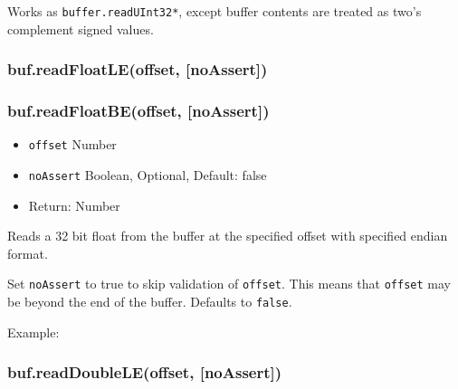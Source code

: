 Works as \texttt{buffer.readUInt32*}, except buffer contents are treated
as two's complement signed values.

\subsubsection{buf.readFloatLE(offset, {[}noAssert{]})}

\subsubsection{buf.readFloatBE(offset, {[}noAssert{]})}

\begin{itemize}
\item
  \texttt{offset} Number
\item
  \texttt{noAssert} Boolean, Optional, Default: false
\item
  Return: Number
\end{itemize}

Reads a 32 bit float from the buffer at the specified offset with
specified endian format.

Set \texttt{noAssert} to true to skip validation of \texttt{offset}.
This means that \texttt{offset} may be beyond the end of the buffer.
Defaults to \texttt{false}.

Example:

\begin{Shaded}
\begin{Highlighting}[]
  \NormalTok{);}

\NormalTok{buf[}\NormalTok{] = }\NormalTok{;}
\NormalTok{buf[}\NormalTok{] = }\NormalTok{;}
\NormalTok{buf[}\NormalTok{] = }\NormalTok{;}
\NormalTok{buf[}\NormalTok{] = }\NormalTok{;}

\NormalTok{(}\NormalTok{(}\NormalTok{));}

\end{Highlighting}
\end{Shaded}

\subsubsection{buf.readDoubleLE(offset, {[}noAssert{]})}

